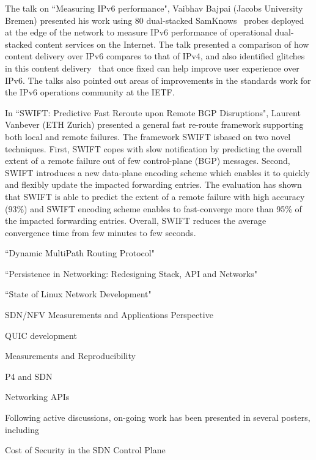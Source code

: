 The talk on ``Measuring IPv6 performance", Vaibhav Bajpai (Jacobs University
Bremen) presented his work using 80
dual-stacked SamKnows~\cite{vbajpai:comst:2015} probes deployed at the edge of
the network to measure IPv6 performance of operational dual-stacked content
services on the Internet. The talk presented a comparison of how content delivery
\cite{vbajpai:networking:2015, sahsan:pam:2015} over IPv6 compares to that of
IPv4, and also identified glitches in this content
delivery~\cite{seravuchira:cnsm:2016} that once fixed can help improve user
experience over IPv6. The talks also pointed out areas of improvements
\cite{vbajpai:anrw:2016} in the standards work for the IPv6 operations
community at the IETF\@.


In ``SWIFT: Predictive Fast Reroute upon Remote BGP Disruptions",
Laurent Vanbever (ETH Zurich) presented a general
fast re-route framework supporting both local and remote failures. The framework
SWIFT isbased on two novel techniques. First, SWIFT copes with slow notification by
predicting the overall extent of a remote failure out of few control-plane
(BGP) messages. Second, SWIFT introduces a new data-plane encoding scheme
which enables it to quickly and flexibly update the impacted forwarding
entries. The evaluation has shown that SWIFT is able to predict the extent of
a remote failure with high accuracy (93\%) and SWIFT encoding scheme enables
to fast-converge more than 95\% of the impacted forwarding entries. Overall,
SWIFT reduces the average convergence time from few minutes to few seconds.

``Dynamic MultiPath Routing Protocol"

``Persistence in Networking: Redesigning Stack, API and Networks"

``State of Linux Network Development"


SDN/NFV Measurements and Applications Perspective

QUIC development

Measurements and Reproducibility

P4 and SDN

Networking APIs



Following active discussions, on-going work has been presented in 
several posters, including 

Cost of Security in the SDN Control Plane

